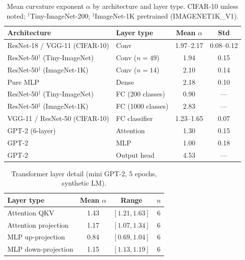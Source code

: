 \documentclass{article}
\begin{document}
\begin{table}[t]
\centering
\caption{Mean curvature exponent $\alpha$ by architecture and layer type. CIFAR-10 unless noted; $^\dagger$Tiny-ImageNet-200; $^\ddagger$ImageNet-1K pretrained (IMAGENET1K\_V1).}
\label{tab:arch-sweep}
\small
\begin{tabular}{llcc}
\toprule
\textbf{Architecture} & \textbf{Layer type} & Mean $\alpha$ & Std \\
\midrule
ResNet-18 / VGG-11 (CIFAR-10) & Conv & 1.97--2.17 & 0.08--0.12 \\
ResNet-50$^\dagger$ (Tiny-ImageNet) & Conv ($n=49$) & 1.94 & 0.15 \\
ResNet-50$^\ddagger$ (ImageNet-1K) & Conv ($n=14$) & 2.10 & 0.14 \\
Pure MLP & Dense & 2.18 & 0.10 \\
\midrule
ResNet-50$^\dagger$ (Tiny-ImageNet) & FC (200 classes) & 0.90 & --- \\
ResNet-50$^\ddagger$ (ImageNet-1K) & FC (1000 classes) & 2.83 & --- \\
VGG-11 / ResNet-50 (CIFAR-10) & FC classifier & 1.23--1.65 & 0.07 \\
GPT-2 (6-layer) & Attention & 1.30 & 0.15 \\
GPT-2 & MLP & 1.00 & 0.18 \\
GPT-2 & Output head & 4.53 & --- \\
\bottomrule
\end{tabular}
\end{table}

\begin{table}[t]
\centering
\caption{Transformer layer detail (mini GPT-2, 5 epochs, synthetic LM).}
\label{tab:transformer}
\small
\begin{tabular}{lccc}
\toprule
\textbf{Layer type} & Mean $\alpha$ & Range & $n$ \\
\midrule
Attention QKV & 1.43 & $[1.21, 1.63]$ & 6 \\
Attention projection & 1.17 & $[1.07, 1.34]$ & 6 \\
MLP up-projection & 0.84 & $[0.69, 1.04]$ & 6 \\
MLP down-projection & 1.15 & $[1.13, 1.19]$ & 6 \\
\bottomrule
\end{tabular}
\end{table}
\end{document}
